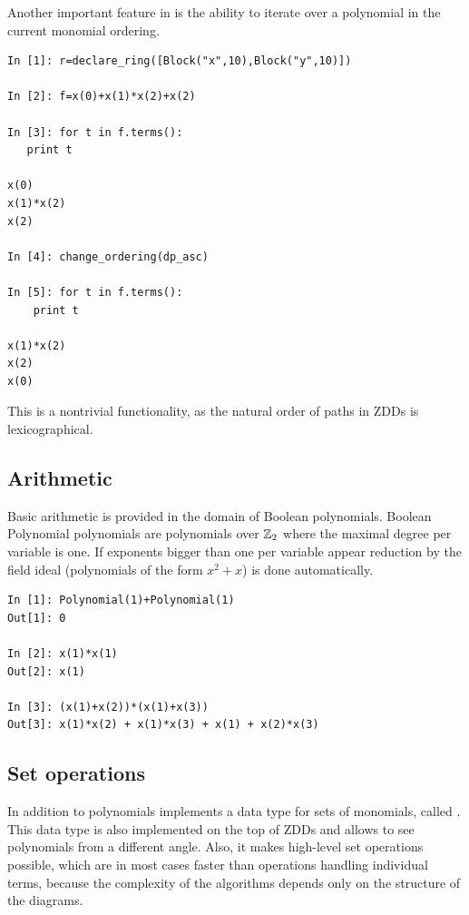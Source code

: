 Another important feature in \PolyBoRi is the ability to iterate over a polynomial in the current monomial ordering.

\begin{lstlisting}
In [1]: r=declare_ring([Block("x",10),Block("y",10)])

In [2]: f=x(0)+x(1)*x(2)+x(2)

In [3]: for t in f.terms():
   print t
   
x(0)
x(1)*x(2)
x(2)

In [4]: change_ordering(dp_asc)

In [5]: for t in f.terms():
    print t

x(1)*x(2)
x(2)
x(0)
\end{lstlisting}
%
This is a nontrivial functionality, as the natural order of paths in ZDDs is lexicographical.


\subsection{Arithmetic}
Basic arithmetic is provided in the domain of Boolean polynomials. Boolean Polynomial polynomials are polynomials over $\mathbb{Z}_2$ where the maximal degree per variable is one.
If exponents bigger than one per variable appear reduction by the field ideal (polynomials of the form $x^2+x$) is done automatically.
\begin{lstlisting}
In [1]: Polynomial(1)+Polynomial(1)
Out[1]: 0

In [2]: x(1)*x(1)
Out[2]: x(1)

In [3]: (x(1)+x(2))*(x(1)+x(3))
Out[3]: x(1)*x(2) + x(1)*x(3) + x(1) + x(2)*x(3)
\end{lstlisting}

\subsection{Set operations}
In addition to polynomials  \PolyBoRi implements a data type for sets of monomials, called .
This data type is also implemented on the top of ZDDs and allows to see
polynomials
from a different angle. Also, it makes high-level set operations possible, which are in most cases faster than operations handling individual terms, because the complexity of the algorithms depends only on the structure of the diagrams.

